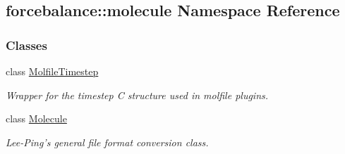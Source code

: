 \hypertarget{namespaceforcebalance_1_1molecule}{\subsection{forcebalance\-:\-:molecule \-Namespace \-Reference}
\label{namespaceforcebalance_1_1molecule}
}
\subsubsection*{\-Classes}
\begin{DoxyCompactItemize}
\item 
class \hyperlink{classforcebalance_1_1molecule_1_1MolfileTimestep}{\-Molfile\-Timestep}
\begin{DoxyCompactList}\small\item\em \-Wrapper for the timestep \-C structure used in molfile plugins. \end{DoxyCompactList}\item 
class \hyperlink{classforcebalance_1_1molecule_1_1Molecule}{\-Molecule}
\begin{DoxyCompactList}\small\item\em \-Lee-\/\-Ping's general file format conversion class. \end{DoxyCompactList}\end{DoxyCompactItemize}

